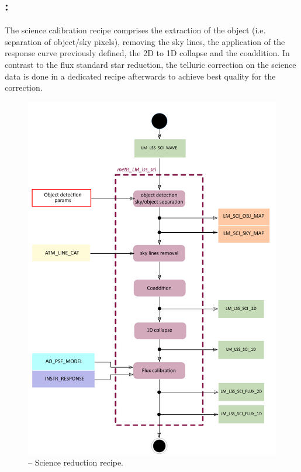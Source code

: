 \subsection{:}
The science calibration recipe comprises the extraction of the object (i.e. separation of object/sky pixels), removing the sky lines, the application of the response curve previously defined, the 2D to 1D collapse and the coaddition. In contrast to the flux standard star reduction, the telluric correction on the science data is done in a dedicated recipe afterwards to achieve best quality for the correction.
\begin{figure}[ht]
  \centering
  \includegraphics[width=0.5\textheight]{figures/metis_lm_lss_sci_v0.64.pdf}
  \caption[Recipe: ]{ --
    Science reduction recipe.}
  \label{Fig:rec_lm_lss_sci}
\end{figure}
\clearpage

